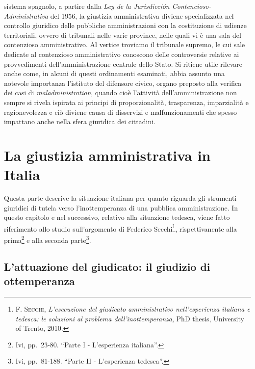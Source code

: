 \documentclass[12pt,it,a4paper,]{report}
\begin{document}
sistema spagnolo, a partire dalla \emph{Ley de la Jurisdicción
Contencioso-Administrativa} del 1956, la giustizia amministrativa
diviene specializzata nel controllo giuridico delle pubbliche
amministrazioni con la costituzione di udienze territoriali, ovvero di
tribunali nelle varie province, nelle quali vi è una sala del
contenzioso amministrativo. Al vertice troviamo il tribunale supremo, le
cui sale dedicate al contenzioso amministrativo conoscono delle
controversie relative ai provvedimenti dell'amministrazione centrale
dello Stato. Si ritiene utile rilevare anche come, in alcuni di questi
ordinamenti esaminati, abbia assunto una notevole importanza l'istituto
del difensore civico, organo preposto alla verifica dei casi di
\emph{maladministration}, quando cioè l'attività dell'amministrazione
non sempre si rivela ispirata ai principi di proporzionalità,
trasparenza, imparzialità e ragionevolezza e ciò diviene causa di
disservizi e malfunzionamenti che spesso impattano anche nella sfera
giuridica dei cittadini.

\hypertarget{la-giustizia-amministrativa-in-italia}{%
\chapter{La giustizia amministrativa in
Italia}\label{la-giustizia-amministrativa-in-italia}}

Questa parte descrive la situazione italiana per quanto riguarda gli
strumenti giuridici di tutela verso l'inottemperanza di una pubblica
amministrazione. In questo capitolo e nel successivo, relativo alla
situazione tedesca, viene fatto riferimento allo studio sull'argomento
di Federico Secchi\footnote{F. \textsc{Secchi}, \emph{L'esecuzione del
  giudicato amministrativo nell'esperienza italiana e tedesca: le
  soluzioni al problema dell'inottemperanza}, PhD thesis, University of
  Trento, 2010.}, rispettivanente alla prima\footnote{Ivi, pp.~23-80.
  ``Parte I - L'esperienza italiana''.} e alla seconda parte\footnote{Ivi,
  pp.~81-188. ``Parte II - L'esperienza tedesca''.}.

\hypertarget{lattuazione-del-giudicato-il-giudizio-di-ottemperanza}{%
\section{L'attuazione del giudicato: il giudizio di
ottemperanza}\label{lattuazione-del-giudicato-il-giudizio-di-ottemperanza}}
\end{document}
